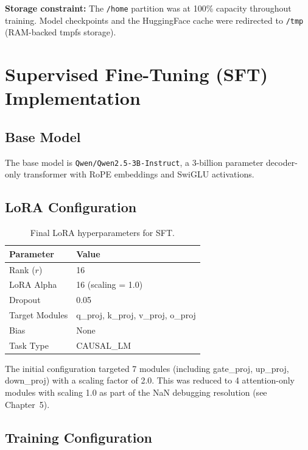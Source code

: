 \documentclass[12pt]{report}
\begin{document}
\textbf{Storage constraint:} The \texttt{/home} partition was at 100\% capacity throughout training. Model checkpoints and the HuggingFace cache were redirected to \texttt{/tmp} (RAM-backed tmpfs storage).

\section{Supervised Fine-Tuning (SFT) Implementation}

\subsection{Base Model}

The base model is \texttt{Qwen/Qwen2.5-3B-Instruct}, a 3-billion parameter decoder-only transformer with RoPE embeddings and SwiGLU activations.

\subsection{LoRA Configuration}

\begin{table}[H]
\centering
\caption{Final LoRA hyperparameters for SFT.}
\label{tab:lora_sft}
\begin{tabular}{ll}
\toprule
\textbf{Parameter} & \textbf{Value} \\
\midrule
Rank ($r$) & 16 \\
LoRA Alpha & 16 (scaling = 1.0) \\
Dropout & 0.05 \\
Target Modules & q\_proj, k\_proj, v\_proj, o\_proj \\
Bias & None \\
Task Type & CAUSAL\_LM \\
\bottomrule
\end{tabular}
\end{table}

The initial configuration targeted 7 modules (including gate\_proj, up\_proj, down\_proj) with a scaling factor of 2.0. This was reduced to 4 attention-only modules with scaling 1.0 as part of the NaN debugging resolution (see Chapter~5).

\subsection{Training Configuration}
\end{document}
